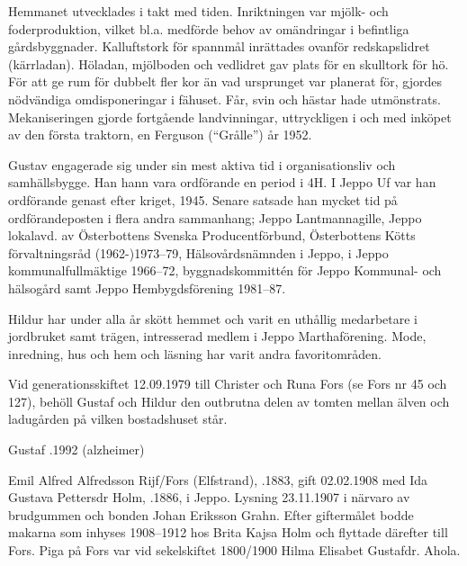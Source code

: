 Hemmanet utvecklades i takt med tiden. Inriktningen var mjölk- och foderproduktion, vilket bl.a. medförde behov av omändringar i befintliga gårdsbyggnader. Kalluftstork för spannmål inrättades ovanför redskapslidret (kärrladan). Höladan, mjölboden och vedlidret gav plats för en skulltork för hö. För att ge rum för dubbelt fler kor än vad ursprunget var planerat för, gjordes nödvändiga omdisponeringar i fähuset. Får, svin och hästar hade utmönstrats. Mekaniseringen gjorde fortgående landvinningar, uttryckligen i och med inköpet av den första traktorn, en Ferguson (``Grålle'') år 1952.

Gustav engagerade sig under sin mest aktiva tid i organisationsliv och 	samhällsbygge. Han hann vara ordförande en period i 4H. I Jeppo Uf var han ordförande genast efter kriget, 1945. Senare satsade han mycket tid på ordförandeposten i flera andra sammanhang; Jeppo Lantmannagille, Jeppo lokalavd. av Österbottens Svenska Producentförbund, Österbottens Kötts förvaltningsråd (1962-)1973--79, Hälsovårdsnämnden i Jeppo, i Jeppo kommunalfullmäktige 1966--72, byggnadskommittén för Jeppo Kommunal- och hälsogård samt Jeppo Hembygdsförening 1981--87.

Hildur har under alla år skött hemmet och varit en uthållig medarbetare i jordbruket samt trägen, intresserad medlem i Jeppo Marthaförening. Mode, inredning, hus och hem och läsning har varit andra favoritområden.

Vid generationsskiftet 12.09.1979 till Christer och Runa Fors (se Fors nr 45 och 127), behöll Gustaf och Hildur den outbrutna delen av tomten mellan älven och ladugården på vilken bostadshuset står.

Gustaf .1992 (alzheimer)



%
Emil Alfred Alfredsson Rijf/Fors (Elfstrand), .1883, gift 02.02.1908 med Ida Gustava Pettersdr Holm, .1886, i Jeppo. Lysning 23.11.1907 i närvaro av brudgummen och bonden Johan Eriksson Grahn. Efter giftermålet bodde makarna som inhyses 1908--1912 hos Brita Kajsa Holm och flyttade därefter till Fors. Piga på Fors var vid sekelskiftet 1800/1900 Hilma Elisabet Gustafdr. Ahola.


